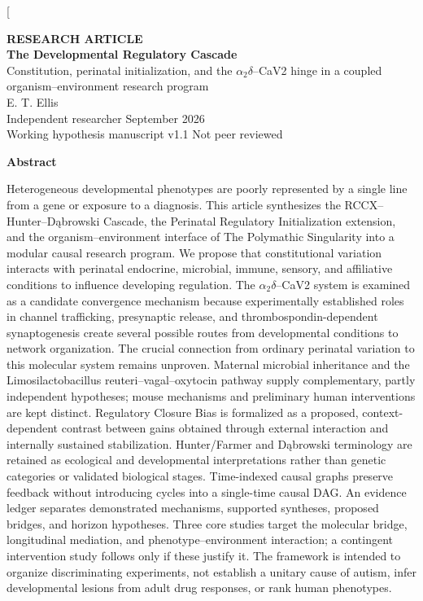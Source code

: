 \documentclass[10pt,letterpaper,twocolumn]{article}
\begin{document}
\twocolumn[{
\begin{center}
{\small\sffamily\bfseries RESEARCH ARTICLE}\\[.7em]
{\huge\bfseries The Developmental Regulatory Cascade}\\[.6em]
{\large Constitution, perinatal initialization, and the \ensuremath{\alpha_2\delta}--CaV2 hinge in a coupled organism--environment research program}\\[1em]
{\normalsize E. T. Ellis}\\
{\small Independent researcher \quad \textbullet {} September 2026}\\[.45em]
{\small Working hypothesis manuscript v1.1 \quad \textbullet \quad Not peer reviewed}
\end{center}
\vspace{.25em}
\begin{center}
\begin{minipage}{.86\textwidth}
\begin{center}\normalsize\sffamily\bfseries Abstract\end{center}
\vspace{.1em}
\small Heterogeneous developmental phenotypes are poorly represented by a single line from a gene or exposure to a diagnosis. This article synthesizes the RCCX–Hunter–Dąbrowski Cascade, the Perinatal Regulatory Initialization extension, and the organism–environment interface of The Polymathic Singularity into a modular causal research program. We propose that constitutional variation interacts with perinatal endocrine, microbial, immune, sensory, and affiliative conditions to influence developing regulation. The \ensuremath{\alpha_2\delta}–CaV2 system is examined as a candidate convergence mechanism because experimentally established roles in channel trafficking, presynaptic release, and thrombospondin-dependent synaptogenesis create several possible routes from developmental conditions to network organization. The crucial connection from ordinary perinatal variation to this molecular system remains unproven. Maternal microbial inheritance and the Limosilactobacillus reuteri–vagal–oxytocin pathway supply complementary, partly independent hypotheses; mouse mechanisms and preliminary human interventions are kept distinct. Regulatory Closure Bias is formalized as a proposed, context-dependent contrast between gains obtained through external interaction and internally sustained stabilization. Hunter/Farmer and Dąbrowski terminology are retained as ecological and developmental interpretations rather than genetic categories or validated biological stages. Time-indexed causal graphs preserve feedback without introducing cycles into a single-time causal DAG. An evidence ledger separates demonstrated mechanisms, supported syntheses, proposed bridges, and horizon hypotheses. Three core studies target the molecular bridge, longitudinal mediation, and phenotype–environment interaction; a contingent intervention study follows only if these justify it. The framework is intended to organize discriminating experiments, not establish a unitary cause of autism, infer developmental lesions from adult drug responses, or rank human phenotypes.


\end{minipage}
\end{center}}
\end{document}
